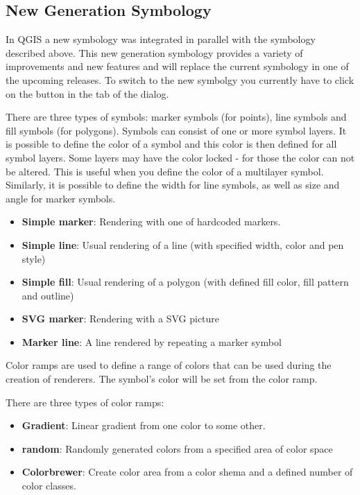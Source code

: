 \subsection{New Generation Symbology}

In QGIS \CURRENT a new symbology was integrated in parallel with the symbology 
described above. This new generation symbology provides a variety of improvements and 
new features and will replace the current symbology in one of the upcoming releases. 
To switch to the new symbolgy you currently have to click on the  button in the  tab of the  dialog.  


There are three types of symbols: marker symbols (for points), line symbols and 
fill symbols (for polygons). Symbols can consist of one or more symbol layers. It 
is possible to define the color of a symbol and this color is then defined for all 
symbol layers. Some layers may have the color locked - for those the color can not 
be altered. This is useful when you define the color of a multilayer symbol. 
Similarly, it is possible to define the width for line symbols, as well as size and 
angle for marker symbols.


\begin{itemize}[label=--]
\item \textbf{Simple marker}: Rendering with one of hardcoded markers.
\item \textbf{Simple line}: Usual rendering of a line (with specified 
width, color and pen style) 
\item \textbf{Simple fill}: Usual rendering of a polygon (with defined 
fill color, fill pattern and outline) 
\item \textbf{SVG marker}: Rendering with a SVG picture 
\item \textbf{Marker line}: A line rendered by repeating a marker symbol 
\end{itemize}


Color ramps are used to define a range of colors that can be used during 
the creation of renderers. The symbol's color will be set from the color ramp. 

There are three types of color ramps:

\begin{itemize}[label=--]
\item \textbf{Gradient}: Linear gradient from one color to some other.
\item \textbf{random}: Randomly generated colors from a specified area of 
color space 
\item \textbf{Colorbrewer}: Create color area from a color shema and a defined 
number of color classes.
\end{itemize}

